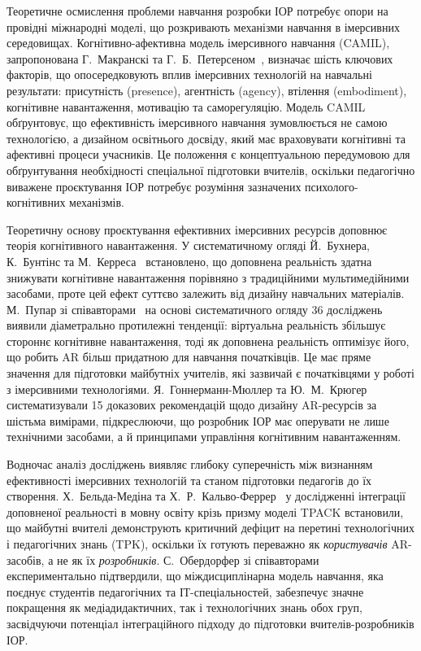 
Теоретичне осмислення проблеми навчання розробки ІОР потребує опори на провідні міжнародні моделі, що розкривають механізми навчання в імерсивних середовищах. Когнітивно-афективна модель імерсивного навчання (CAMIL), запропонована Г.~Макранскі та Г.~Б.~Петерсеном~\cite{Makransky2021CAMIL}, визначає шість ключових факторів, що опосередковують вплив імерсивних технологій на навчальні результати: присутність (presence), агентність (agency), втілення (embodiment), когнітивне навантаження, мотивацію та саморегуляцію. Модель CAMIL обґрунтовує, що ефективність імерсивного навчання зумовлюється не самою технологією, а дизайном освітнього досвіду, який має враховувати когнітивні та афективні процеси учасників. Це положення є концептуальною передумовою для обґрунтування необхідності спеціальної підготовки вчителів, оскільки педагогічно виважене проєктування ІОР потребує розуміння зазначених психолого-когнітивних механізмів.

Теоретичну основу проєктування ефективних імерсивних ресурсів доповнює теорія когнітивного навантаження. У систематичному огляді Й.~Бухнера, К.~Бунтінс та М.~Керреса~\cite{Buchner2021CogLoad} встановлено, що доповнена реальність здатна знижувати когнітивне навантаження порівняно з традиційними мультимедійними засобами, проте цей ефект суттєво залежить від дизайну навчальних матеріалів. М.~Пупар зі співавторами~\cite{Poupard2024Systematic} на основі систематичного огляду 36 досліджень виявили діаметрально протилежні тенденції: віртуальна реальність збільшує стороннє когнітивне навантаження, тоді як доповнена реальність оптимізує його, що робить AR більш придатною для навчання початківців. Це має пряме значення для підготовки майбутніх учителів, які зазвичай є початківцями у роботі з імерсивними технологіями. Я.~Гоннерманн-Мюллер та Ю.~М.~Крюгер~\cite{GonnermannMuller2024ARDesign} систематизували 15 доказових рекомендацій щодо дизайну AR-ресурсів за шістьма вимірами, підкреслюючи, що розробник ІОР має оперувати не лише технічними засобами, а й принципами управління когнітивним навантаженням.

Водночас аналіз досліджень виявляє глибоку суперечність між визнанням ефективності імерсивних технологій та станом підготовки педагогів до їх створення. Х.~Бельда-Медіна та Х.~Р.~Кальво-Феррер~\cite{BeldaMedina2022TPACK} у дослідженні інтеграції доповненої реальності в мовну освіту крізь призму моделі TPACK встановили, що майбутні вчителі демонструють критичний дефіцит на перетині технологічних і педагогічних знань (TPK), оскільки їх готують переважно як \emph{користувачів} AR-засобів, а не як їх \emph{розробників}. С.~Обердорфер зі співавторами~\cite{Oberdorfer2021Interdisciplinary} експериментально підтвердили, що міждисциплінарна модель навчання, яка поєднує студентів педагогічних та ІТ-спеціальностей, забезпечує значне покращення як медіадидактичних, так і технологічних знань обох груп, засвідчуючи потенціал інтеграційного підходу до підготовки вчителів-розробників ІОР.

